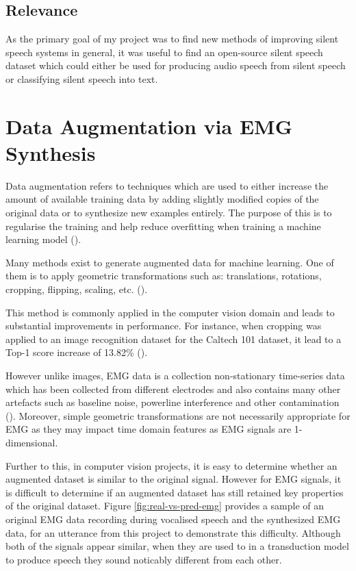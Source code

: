 \subsection{Relevance}

As the primary goal of my project was to find new methods of improving silent
speech systems in general, it was useful to find an open-source silent speech
dataset which could either be used for producing audio speech from silent
speech or classifying silent speech into text.

\section{Data Augmentation via EMG Synthesis}

Data augmentation refers to techniques which are used to either increase
the amount of available training data by adding slightly modified
copies of the original data or to synthesize new examples entirely.
The purpose of this is to regularise the training and help reduce overfitting
when training a machine learning model (\cite{data_augmentation_def}).

Many methods exist to generate augmented data for machine learning.
One of them is to apply geometric transformations such as: translations, rotations,
cropping, flipping, scaling, etc. (\cite{data_augmentation_def}).

This method is commonly applied in the computer vision domain and
leads to substantial improvements in performance. For instance,
when cropping was applied to an image recognition dataset for the
Caltech 101 dataset, it lead to a Top-1 score increase of 13.82\%
(\cite{geometric_augment}).

However unlike images, EMG data is a collection non-stationary
time-series data which has been collected from different electrodes
and also contains many other artefacts such as baseline noise,
powerline interference and other contamination (\cite{semg_filtering}).
Moreover, simple geometric transformations are not necessarily appropriate
for EMG as they may impact time domain features as EMG signals are
1-dimensional.

Further to this, in computer vision projects, it is easy to determine whether
an augmented dataset is similar to the original signal. However for EMG
signals, it is difficult to determine if an augmented dataset has still
retained key properties of the original dataset.
Figure \ref{fig:real-vs-pred-emg} provides a sample of an original
EMG data recording during vocalised speech and the synthesized EMG
data, for an utterance from this project to demonstrate this difficulty.
Although both of the signals appear similar, when they are used to in
a transduction model to produce speech they sound noticably different from
each other.

